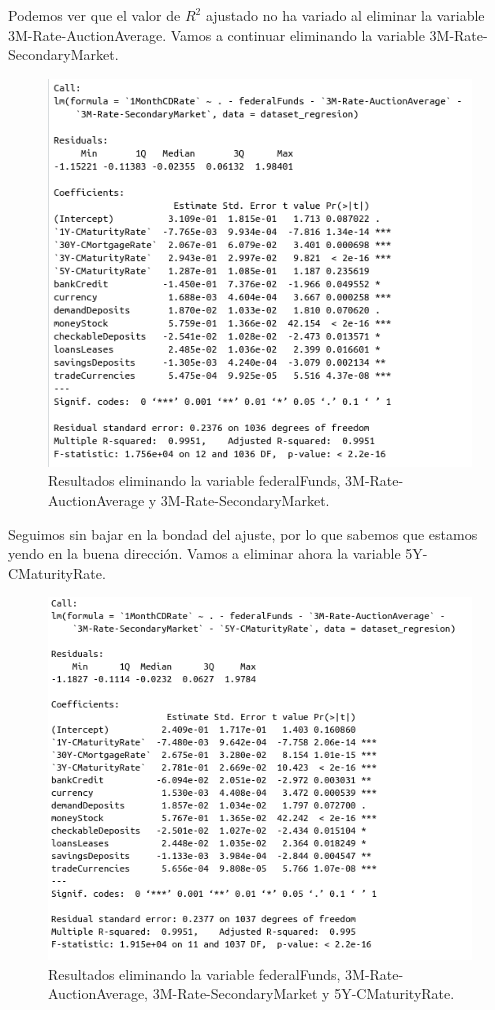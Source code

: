 \documentclass[12pt,a4paper]{article}
\begin{document}
Podemos ver que el valor de $R^2$ ajustado no ha variado al eliminar la variable 3M-Rate-AuctionAverage. Vamos a continuar eliminando la variable 3M-Rate-SecondaryMarket.

\begin{figure}[H]
	\centering 
	\includegraphics[scale=0.65]{./Imagenes/Regresion/regresion_multiple4.png}
	\caption{Resultados eliminando la variable federalFunds, 3M-Rate-AuctionAverage y 3M-Rate-SecondaryMarket.}
\end{figure}

Seguimos sin bajar en la bondad del ajuste, por lo que sabemos que estamos yendo en la buena dirección. Vamos a eliminar ahora la variable 5Y-CMaturityRate.

\begin{figure}[H]
	\centering 
	\includegraphics[scale=0.6]{./Imagenes/Regresion/regresion_multiple5.png}
	\caption{Resultados eliminando la variable federalFunds, 3M-Rate-AuctionAverage, 3M-Rate-SecondaryMarket y 5Y-CMaturityRate.}
\end{figure}
\end{document}
